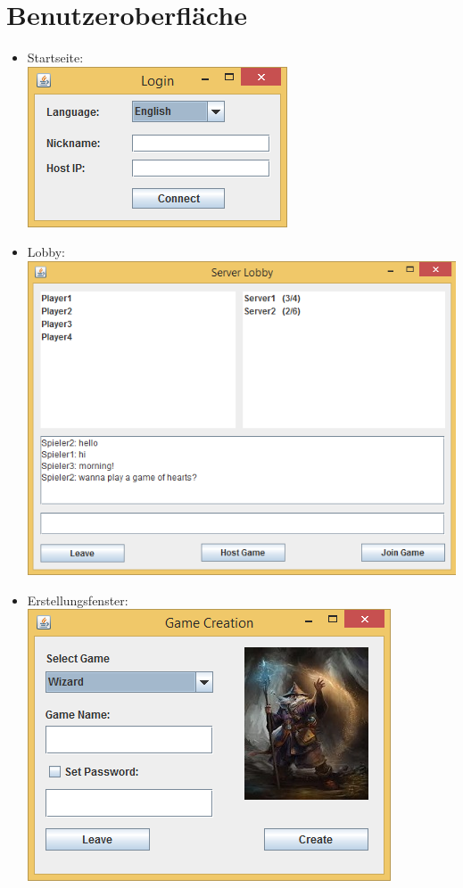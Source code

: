 \documentclass{article}
\begin{document}
\section{Benutzeroberfläche}
\begin{itemize}
	\item Startseite: \\ \includegraphics{GUI_images/Login}
	\item Lobby: \\ \includegraphics[scale=0.7]{GUI_images/ServerLobby}
	\item \gls{Erstellungsfenster}: \\ 
		\includegraphics[scale=0.8]{GUI_images/CreateGame}

\end{itemize}
\end{document}
